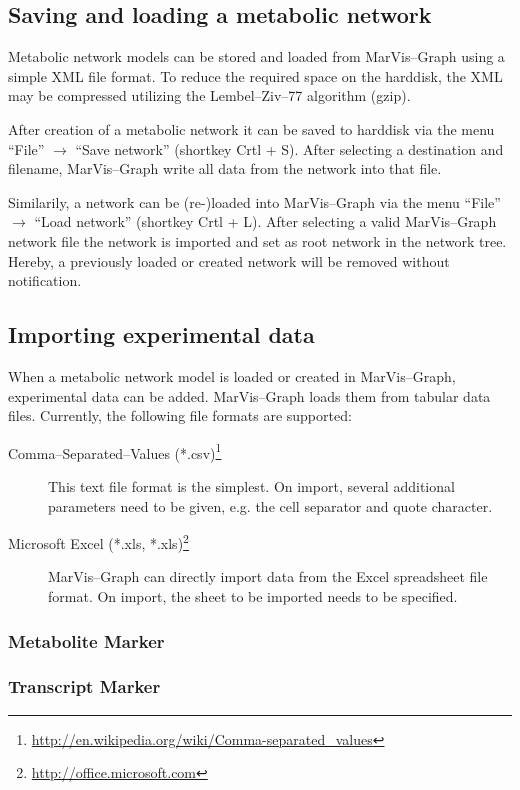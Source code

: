 \documentclass[titlepage,a4paper,twoside]{article}
\newcommand{\mg}{MarVis--Graph\xspace}
\begin{document}
\subsection{Saving and loading a metabolic network}\label{ssec:saveload}

Metabolic network models can be stored and loaded from \mg using a simple XML
file format. To reduce the required space on the harddisk, the XML may be
compressed utilizing the Lembel--Ziv--77 algorithm (gzip).

After creation of a metabolic network it can be saved to harddisk
via the menu ``File'' $\rightarrow$ ``Save network'' (shortkey Crtl + S). 
After selecting a destination and filename, \mg write all data from the
network into that file. 

Similarily, a network can be (re-)loaded into \mg via the menu ``File''
$\rightarrow$ ``Load network'' (shortkey Crtl + L). After selecting a valid
\mg network file the network is imported and set as root network in the
network tree. Hereby, a previously loaded or created network will be removed
without notification.

\subsection{Importing experimental data}

When a metabolic network model is loaded or created in \mg, experimental
data can be added. \mg loads them from tabular data files. Currently, the
following file formats are supported:
\begin{description}
	\item[Comma--Separated--Values (*.csv)\footnote{\url{http://en.wikipedia.org/wiki/Comma-separated_values}}]
		This text file format is the simplest. On import, several additional
		parameters need to be given, e.g. the cell separator and quote
		character.
	\item[Microsoft Excel (*.xls, *.xls)\footnote{\url{http://office.microsoft.com}}]
		\mg can directly import data from the Excel spreadsheet file format.
		On import, the sheet to be imported needs to be specified.
\end{description}

\subsubsection{Metabolite Marker}

\subsubsection{Transcript Marker}
\end{document}
